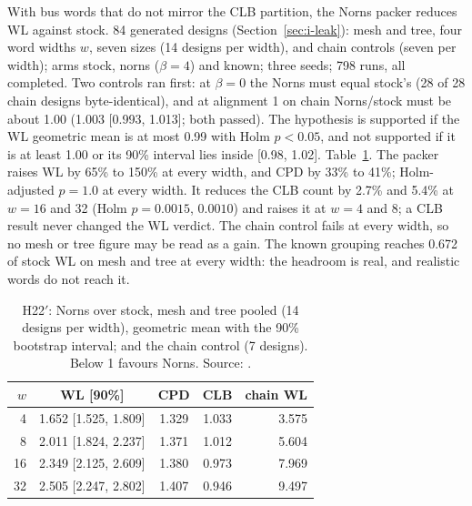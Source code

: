  With bus words that do not mirror the CLB partition, the Norns packer reduces WL against stock.
 84 generated designs (Section~\ref{sec:i-leak}): mesh and tree, four word widths $w$, seven sizes (14 designs per width), and chain controls (seven per width); arms stock, norns ($\beta=4$) and known; three seeds; 798 runs, all completed. Two controls ran first: at $\beta=0$ the Norns  must equal stock's (28 of 28 chain designs byte-identical), and at alignment 1 on chain Norns/stock must be about 1.00 (1.003 [0.993, 1.013]; both passed). The hypothesis is supported if the WL geometric mean is at most 0.99 with Holm $p<0.05$, and not supported if it is at least 1.00 or its 90\% interval lies inside [0.98, 1.02].
 Table~\ref{tab:h22p}. The packer raises WL by 65\% to 150\% at every width, and CPD by 33\% to 41\%; Holm-adjusted $p=1.0$ at every width. It reduces the CLB count by 2.7\% and 5.4\% at $w=16$ and 32 (Holm $p=0.0015$, $0.0010$) and raises it at $w=4$ and 8; a CLB result never changed the WL verdict. The chain control fails at every width, so no mesh or tree figure may be read as a gain. The known grouping reaches 0.672 of stock WL on mesh and tree at every width: the headroom is real, and realistic words do not reach it.

\begin{table}[t]
\caption{H22$'$: Norns over stock, mesh and tree pooled (14 designs per width), geometric mean with the 90\% bootstrap interval; and the chain control (7 designs). Below 1 favours Norns. Source: .}
\label{tab:h22p}
\centering
\footnotesize
\begin{tabular}{@{}rcccr@{}}
\toprule
$w$ & WL [90\%] & CPD & CLB & chain WL \\
\midrule
4 & 1.652 [1.525, 1.809] & 1.329 & 1.033 & 3.575 \\
8 & 2.011 [1.824, 2.237] & 1.371 & 1.012 & 5.604 \\
16 & 2.349 [2.125, 2.609] & 1.380 & 0.973 & 7.969 \\
32 & 2.505 [2.247, 2.802] & 1.407 & 0.946 & 9.497 \\
\bottomrule
\end{tabular}
\end{table}

